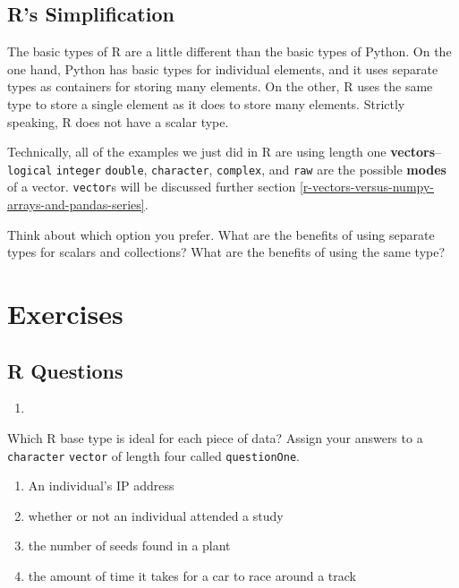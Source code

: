 \documentclass[12pt,krantz2]{krantz}
\providecommand{\tightlist}{%
  \setlength{\itemsep}{0pt}\setlength{\parskip}{0pt}}
\begin{document}
\hypertarget{rs-simplification}{%
\subsection{R's Simplification}\label{rs-simplification}}

The basic types of R are a little different than the basic types of Python. On the one hand, Python has basic types for individual elements, and it uses separate types as containers for storing many elements. On the other, R uses the same type to store a single element as it does to store many elements. Strictly speaking, R does not have a scalar type.

Technically, all of the examples we just did in R are using length one \textbf{vectors}--\texttt{logical} \texttt{integer} \texttt{double}, \texttt{character}, \texttt{complex}, and \texttt{raw} are the possible \textbf{modes} of a vector. \texttt{vector}s will be discussed further section \ref{r-vectors-versus-numpy-arrays-and-pandas-series}.

Think about which option you prefer. What are the benefits of using separate types for scalars and collections? What are the benefits of using the same type?

\hypertarget{exercises}{%
\section{Exercises}\label{exercises}}

\hypertarget{r-questions}{%
\subsection{R Questions}\label{r-questions}}

\begin{enumerate}
\def\labelenumi{\arabic{enumi}.}
\item
\end{enumerate}

Which R base type is ideal for each piece of data? Assign your answers to a \texttt{character} \texttt{vector} of length four called \texttt{questionOne}.

\begin{enumerate}
\def\labelenumi{\alph{enumi})}
\tightlist
\item
  An individual's IP address
\item
  whether or not an individual attended a study
\item
  the number of seeds found in a plant
\item
  the amount of time it takes for a car to race around a track
\end{enumerate}
\end{document}

